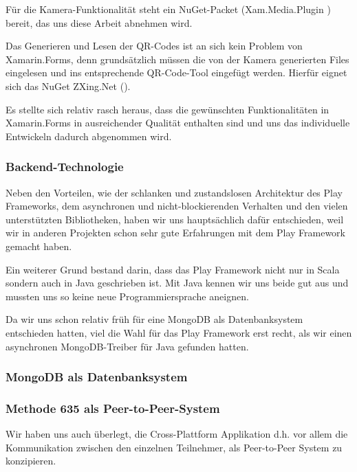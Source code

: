Für die Kamera-Funktionalität steht ein NuGet-Packet (Xam.Media.Plugin \cite{xam-media-plugin}) bereit, das uns diese Arbeit abnehmen wird.

Das Generieren und Lesen der QR-Codes ist an sich kein Problem von Xamarin.Forms, denn grundsätzlich müssen die von der Kamera generierten Files eingelesen und ins entsprechende QR-Code-Tool eingefügt werden. Hierfür eignet sich das NuGet ZXing.Net (\cite{zxing.net}). 

Es stellte sich relativ rasch heraus, dass die gewünschten Funktionalitäten in Xamarin.Forms in ausreichender Qualität enthalten sind und uns das individuelle Entwickeln dadurch abgenommen wird.

\subsubsection{Backend-Technologie}
Neben den Vorteilen, wie der schlanken und zustandslosen Architektur des Play Frameworks, dem asynchronen und nicht-blockierenden Verhalten und den vielen unterstützten Bibliotheken, haben wir uns hauptsächlich dafür entschieden, weil wir in anderen Projekten schon sehr gute Erfahrungen mit dem Play Framework gemacht haben.

Ein weiterer Grund bestand darin, dass das Play Framework nicht nur in Scala sondern auch in Java geschrieben ist. Mit Java kennen wir uns beide gut aus und mussten uns so keine neue Programmiersprache aneignen.

Da wir uns schon relativ früh für eine MongoDB als Datenbanksystem entschieden hatten, viel die Wahl für das Play Framework erst recht, als wir einen asynchronen MongoDB-Treiber für Java gefunden hatten.

\subsubsection{MongoDB als Datenbanksystem}

\subsubsection{Methode 635 als Peer-to-Peer-System}
Wir haben uns auch überlegt, die Cross-Plattform Applikation d.h. vor allem die Kommunikation zwischen den einzelnen Teilnehmer, als Peer-to-Peer System \cite{Peer2Peer} zu konzipieren.



